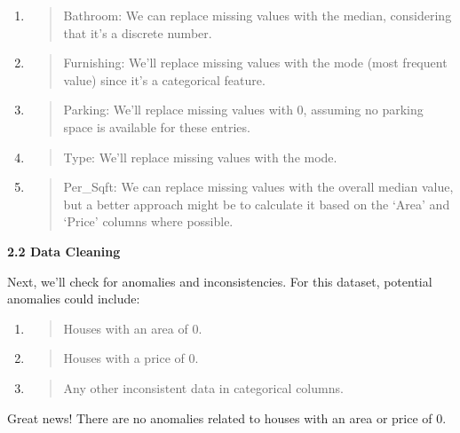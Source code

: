 \documentclass[]{article}
\begin{document}
\begin{enumerate}
\def\labelenumi{\arabic{enumi}.}
\item
  \begin{quote}
  Bathroom: We can replace missing values with the median, considering
  that it's a discrete number.
  \end{quote}
\item
  \begin{quote}
  Furnishing: We'll replace missing values with the mode (most frequent
  value) since it's a categorical feature.
  \end{quote}
\item
  \begin{quote}
  Parking: We'll replace missing values with 0, assuming no parking
  space is available for these entries.
  \end{quote}
\item
  \begin{quote}
  Type: We'll replace missing values with the mode.
  \end{quote}
\item
  \begin{quote}
  Per\_Sqft: We can replace missing values with the overall median
  value, but a better approach might be to calculate it based on the
  `Area' and `Price' columns where possible.
  \end{quote}
\end{enumerate}

\textbf{2.2 Data Cleaning}

Next, we'll check for anomalies and inconsistencies. For this dataset,
potential anomalies could include:

\begin{enumerate}
\def\labelenumi{\arabic{enumi}.}
\item
  \begin{quote}
  Houses with an area of 0.
  \end{quote}
\item
  \begin{quote}
  Houses with a price of 0.
  \end{quote}
\item
  \begin{quote}
  Any other inconsistent data in categorical columns.
  \end{quote}
\end{enumerate}

Great news! There are no anomalies related to houses with an area or
price of 0.
\end{document}
